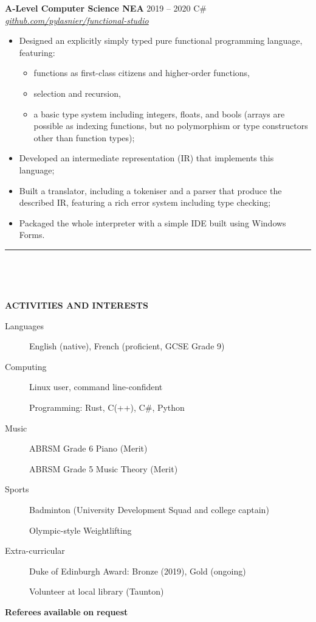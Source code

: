 \documentclass[
  11pt,
  a4paper,
]{article}
\providecommand{\tightlist}{%
  \setlength{\itemsep}{0pt}\setlength{\parskip}{0pt}}
\newcommand{\itemspace}{0.8ex}
\newcommand{\ruledheader}[2]{%
\begingroup
\setlength{\fboxsep}{0pt}%
\colorbox{#1}{%
\parbox[b][1.2ex][t]{35mm}{\begin{tiny}\ \end{tiny}}}%
\parbox[b][1.2ex][t]{5mm}{\begin{tiny}\ \end{tiny}}%
\uppercase{\textbf{#2}}
\endgroup}
\begin{document}
\vspace{\itemspace}

\textbf{A-Level Computer Science NEA} \textbar{} 2019 – 2020 \textbar{}
C\# \textbar{}
\href{https://github.com/pylasnier/functional-studio}{\emph{github.com/pylasnier/functional-studio}}

\begin{itemize}
\tightlist
\item
  Designed an explicitly simply typed pure functional programming
  language, featuring:

  \begin{itemize}
  \tightlist
  \item
    functions as first-class citizens and higher-order functions,
  \item
    selection and recursion,
  \item
    a basic type system including integers, floats, and bools (arrays
    are possible as indexing functions, but no polymorphism or type
    constructors other than function types);
  \end{itemize}
\item
  Developed an intermediate representation (IR) that implements this
  language;
\item
  Built a translator, including a tokeniser and a parser that produce
  the described IR, featuring a rich error system including type
  checking;
\item
  Packaged the whole interpreter with a simple IDE built using Windows
  Forms.
\end{itemize}

\begin{Large}

\vspace{-1.5ex}\rule{\textwidth}{0.8pt}\vspace{2ex}

\ruledheader{cyan!50!teal}{Activities and Interests}\end{Large}

\vspace{\itemspace}

\begin{description}
\item[Languages]
English (native), French (proficient, GCSE Grade 9)
\item[Computing]
Linux user, command line-confident

Programming: Rust, C(++), C\#, Python
\item[Music]
ABRSM Grade 6 Piano (Merit)

ABRSM Grade 5 Music Theory (Merit)
\item[Sports]
Badminton (University Development Squad and college captain)

Olympic-style Weightlifting
\item[Extra-curricular]
Duke of Edinburgh Award: Bronze (2019), Gold (ongoing)

Volunteer at local library (Taunton)
\end{description}

\vspace{2.0ex}\begin{center}

\textbf{Referees} \textbf{available} \textbf{on} \textbf{request}

\end{center}
\end{document}
